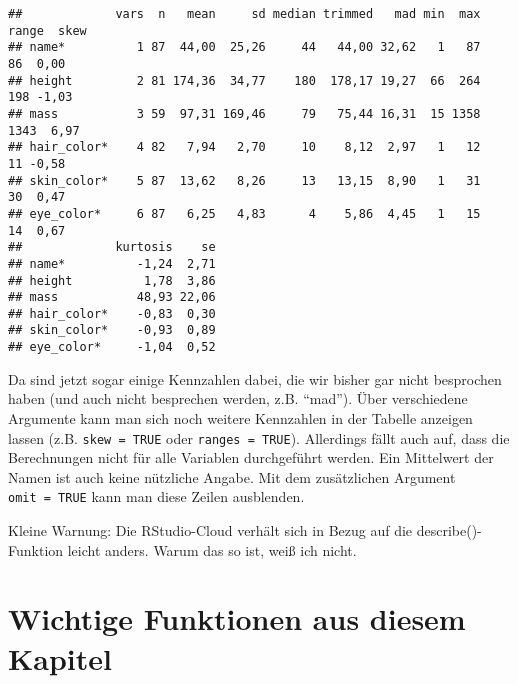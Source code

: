 \documentclass[
]{book}
\begin{document}
\begin{verbatim}
##             vars  n   mean     sd median trimmed   mad min  max range  skew
## name*          1 87  44,00  25,26     44   44,00 32,62   1   87    86  0,00
## height         2 81 174,36  34,77    180  178,17 19,27  66  264   198 -1,03
## mass           3 59  97,31 169,46     79   75,44 16,31  15 1358  1343  6,97
## hair_color*    4 82   7,94   2,70     10    8,12  2,97   1   12    11 -0,58
## skin_color*    5 87  13,62   8,26     13   13,15  8,90   1   31    30  0,47
## eye_color*     6 87   6,25   4,83      4    5,86  4,45   1   15    14  0,67
##             kurtosis    se
## name*          -1,24  2,71
## height          1,78  3,86
## mass           48,93 22,06
## hair_color*    -0,83  0,30
## skin_color*    -0,93  0,89
## eye_color*     -1,04  0,52
\end{verbatim}

Da sind jetzt sogar einige Kennzahlen dabei, die wir bisher gar nicht besprochen haben (und auch nicht besprechen werden, z.B. ``mad''). Über verschiedene Argumente kann man sich noch weitere Kennzahlen in der Tabelle anzeigen lassen (z.B. \texttt{skew\ =\ TRUE} oder \texttt{ranges\ =\ TRUE}). Allerdings fällt auch auf, dass die Berechnungen nicht für alle Variablen durchgeführt werden. Ein Mittelwert der Namen ist auch keine nützliche Angabe. Mit dem zusätzlichen Argument \texttt{omit\ =\ TRUE} kann man diese Zeilen ausblenden.

Kleine Warnung: Die RStudio-Cloud verhält sich in Bezug auf die describe()-Funktion leicht anders. Warum das so ist, weiß ich nicht.

\hypertarget{wichtige-funktionen-aus-diesem-kapitel-2}{%
\section*{Wichtige Funktionen aus diesem Kapitel}\label{wichtige-funktionen-aus-diesem-kapitel-2}}
\end{document}
